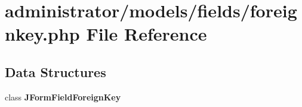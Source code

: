 \section{administrator/models/fields/foreignkey.php File Reference}
\label{administrator_2models_2fields_2foreignkey_8php}
\subsection*{Data Structures}
\begin{DoxyCompactItemize}
\item 
class \textbf{ J\+Form\+Field\+Foreign\+Key}
\end{DoxyCompactItemize}
